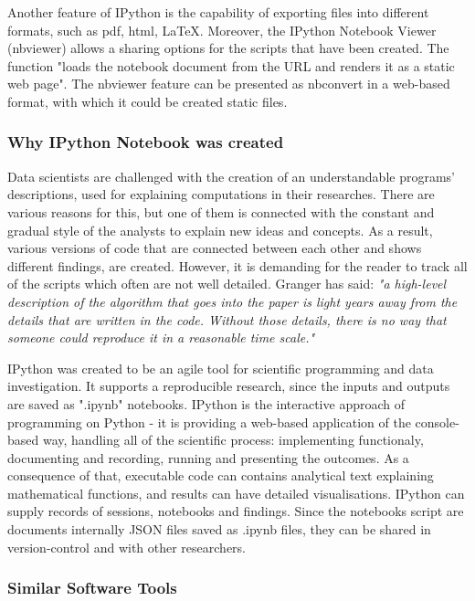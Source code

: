Another feature of IPython is the capability of exporting files into different formats, such as pdf, html, LaTeX. Moreover, the IPython Notebook Viewer (nbviewer) allows a sharing options for the scripts that have been created. The function "loads the notebook document from the URL and renders it as a static web page".\cite{ipythonDef} The nbviewer feature can be presented as  nbconvert in a web-based format, with which it could be created static files. 

\subsubsection{Why IPython Notebook was created}

Data scientists are challenged with the creation of an understandable programs' descriptions, used for explaining computations in their researches. There are various reasons for this, but one of them is connected with the constant and gradual style of the analysts to explain new ideas and concepts. As a result, various versions of code that are connected between each other and shows different findings, are created. However, it is demanding for the reader to track all of the scripts which often are not well detailed. Granger has said: \textit{"a high-level description of the algorithm that goes into the paper is light years away from the details that are written in the code. Without those details, there is no way that someone could reproduce it in a reasonable time scale."} \cite{shen2014interactive}

IPython was created to be an agile tool for scientific programming and data investigation. It supports a reproducible research, since the inputs and outputs are saved as ".ipynb" notebooks. IPython is the interactive approach of programming on Python - it is providing a web-based application of the console-based way, handling all of the scientific process: implementing functionaly, documenting and recording, running and presenting the outcomes. As a consequence of that, executable code can contains analytical text explaining mathematical functions, and results can have detailed visualisations. IPython can supply records of sessions, notebooks and findings. Since the notebooks script are documents internally JSON files saved as .ipynb files, they can be shared in version-control and with other researchers. \cite{ipythonFeatures}

\subsubsection{Similar Software Tools}

